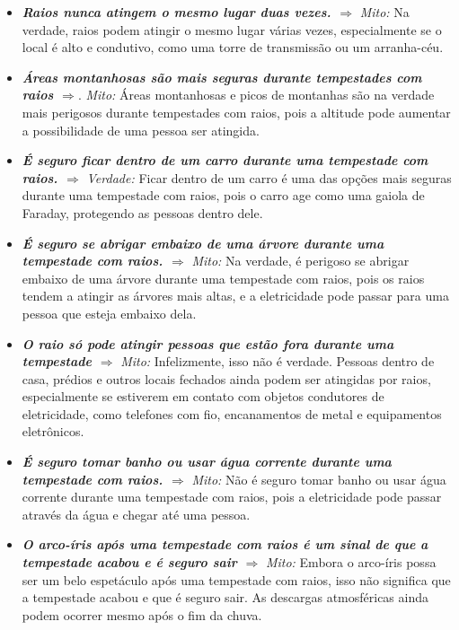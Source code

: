 \documentclass[a4paper, 12pt, onecolumn,singlespacing]{article}
\begin{document}
	\begin{itemize}
		\item \textbf{\textit{ Raios nunca atingem o mesmo lugar duas vezes. $\Rightarrow$}}
		\textit{Mito:} Na verdade, raios podem atingir o mesmo lugar várias vezes, especialmente se o local é alto e condutivo, como uma torre de transmissão ou um arranha-céu.
		
		\item 	\textbf{\textit{Áreas montanhosas são mais seguras durante tempestades com raios $\Rightarrow$}}.
		\textit{Mito:}  Áreas montanhosas e picos de montanhas são na verdade mais perigosos durante tempestades com raios, pois a altitude pode aumentar a possibilidade de uma pessoa ser atingida.
		
		\item \textbf{\textit{É seguro ficar dentro de um carro durante uma tempestade com raios. $\Rightarrow$}}
		\textit{Verdade:} Ficar dentro de um carro é uma das opções mais seguras durante uma tempestade com raios, pois o carro age como uma gaiola de Faraday, protegendo as pessoas dentro dele.
		
		\item \textbf{\textit{É seguro se abrigar embaixo de uma árvore durante uma tempestade com raios. $\Rightarrow$}}
		\textit{Mito:} Na verdade, é perigoso se abrigar embaixo de uma árvore durante uma tempestade com raios, pois os raios tendem a atingir as árvores mais altas, e a eletricidade pode passar para uma pessoa que esteja embaixo dela.
		
		\item \textbf{\textit{O raio só pode atingir pessoas que estão fora durante uma tempestade $\Rightarrow$}} \textit{Mito:} Infelizmente, isso não é verdade. Pessoas dentro de casa, prédios e outros locais fechados ainda podem ser atingidas por raios, especialmente se estiverem em contato com objetos condutores de eletricidade, como telefones com fio, encanamentos de metal e equipamentos eletrônicos.
		
		\item \textbf{\textit{É seguro tomar banho ou usar água corrente durante uma tempestade com raios. $\Rightarrow$}}
		\textit{Mito: } Não é seguro tomar banho ou usar água corrente durante uma tempestade com raios, pois a eletricidade pode passar através da água e chegar até uma pessoa.
		
		\item \textbf{\textit{O arco-íris após uma tempestade com raios é um sinal de que a tempestade acabou e é seguro sair $\Rightarrow$}}
		\textit{Mito:} Embora o arco-íris possa ser um belo espetáculo após uma tempestade com raios, isso não significa que a tempestade acabou e que é seguro sair. As descargas atmosféricas ainda podem ocorrer mesmo após o fim da chuva.
		

\end{itemize}
\end{document}
